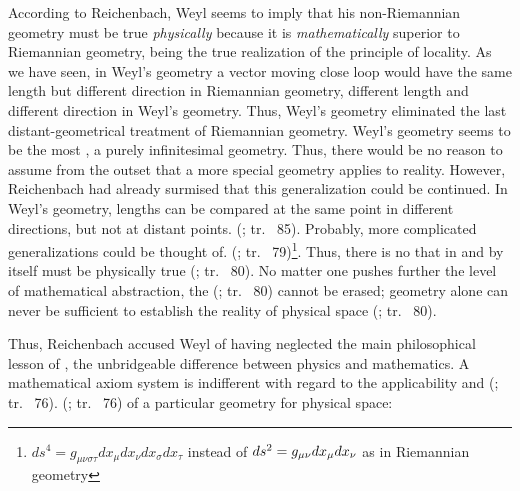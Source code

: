 \documentclass[draft]{article}
\newcommand{\WG}{Weyl's geometry\xspace}
\newcommand{\rhp}[2]{(\cite[#1]{Reichenbach1920a}; tr.\ \citeyear{Reichenbach1969} #2)\xspace}
\begin{document}
According to Reichenbach, Weyl seems to imply that his non-Riemannian geometry must be true \emph{physically} because it is \emph{mathematically} superior to Riemannian geometry, being the true realization of the principle of locality. As we have seen, in \WG a vector moving close loop would have the same length but different direction in Riemannian geometry, different length and different direction in \WG. Thus, \WG eliminated the last distant-geometrical treatment of Riemannian geometry. \WG seems to be the most , a purely infinitesimal geometry. Thus, there would be no reason to assume from the outset that a more special geometry applies to reality. However, Reichenbach had already surmised that this generalization could be continued. In \WG, lengths can be compared at the same point in different directions, but not at distant points.  \rhp{76}{85}. Probably, more complicated generalizations could be thought of.  \rhp{76}{79}\footnote{$d s^{4}=g_{\mu \nu \sigma \tau} d x_{\mu} d x_{\nu} d x_{\sigma} d x_{\tau}$ instead of $d s^{2}=g_{\mu\nu} d x_{\mu} d x_{\nu}$ as in Riemannian geometry}. Thus, there is no  that in and by itself must be physically true \rhp{76}{80}. No matter one pushes further the level of mathematical abstraction, the   \rhp{76}{80} cannot be erased; geometry alone can never be sufficient to establish the reality of physical space \rhp{76}{80}. 

Thus, Reichenbach accused Weyl of having neglected the main philosophical lesson of \gr, the unbridgeable difference between physics and mathematics. A mathematical axiom system is indifferent with regard to the applicability and  \rhp{73}{76}.  \rhp{73}{76} of a particular geometry for physical space:
\end{document}
